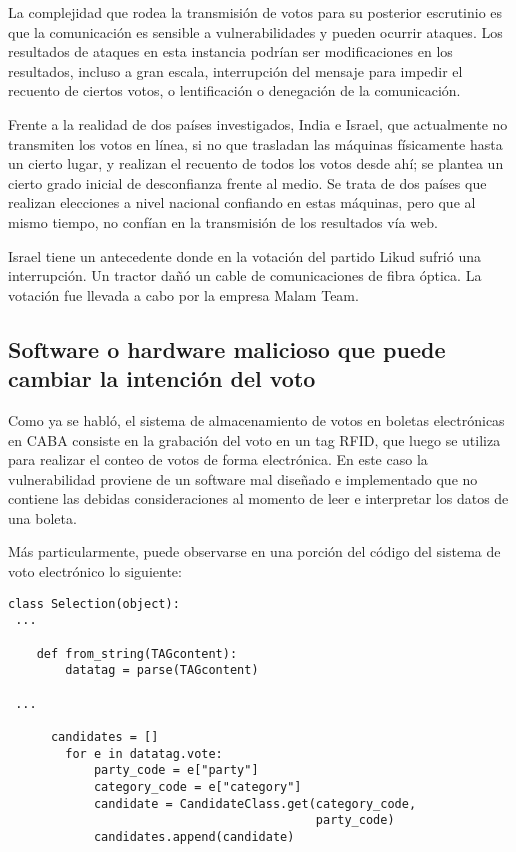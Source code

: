 La complejidad que rodea la transmisión de votos para su posterior escrutinio es que la comunicación es sensible a vulnerabilidades y pueden ocurrir ataques. Los resultados de ataques en esta instancia podrían ser modificaciones en los resultados, incluso a gran escala, interrupción del mensaje para impedir el recuento de ciertos votos, o lentificación o denegación de la comunicación.

Frente a la realidad de dos países investigados, India e Israel, que actualmente no transmiten los votos en línea, si no que trasladan las máquinas físicamente hasta un cierto lugar, y realizan el recuento de todos los votos desde ahí; se plantea un cierto grado inicial de desconfianza frente al medio. Se trata de dos países que realizan elecciones a nivel nacional confiando en estas máquinas, pero que al mismo tiempo, no confían en la transmisión de los resultados vía web.

Israel tiene un antecedente donde en la votación del partido Likud sufrió una interrupción. Un tractor dañó un cable de comunicaciones de fibra óptica. La votación fue llevada a cabo por la empresa Malam Team\cite{haaretz}.

\subsection{Software o hardware malicioso que puede cambiar la intención del voto}
Como ya se habló, el sistema de almacenamiento de votos en boletas electrónicas en CABA consiste en la grabación del voto en un tag RFID, que luego se utiliza para realizar el conteo de votos de forma electrónica. En este caso la vulnerabilidad proviene de un software mal diseñado e implementado que no contiene las debidas consideraciones al momento de leer e interpretar los datos de una boleta.

Más particularmente, puede observarse en una porción del código del sistema de voto electrónico lo siguiente:

\begin{lstlisting}
class Selection(object):
 ...

    def from_string(TAGcontent):
        datatag = parse(TAGcontent)

 ...

      candidates = []
        for e in datatag.vote:
            party_code = e["party"]
            category_code = e["category"]
            candidate = CandidateClass.get(category_code,
                                           party_code)
            candidates.append(candidate)

\end{lstlisting}

